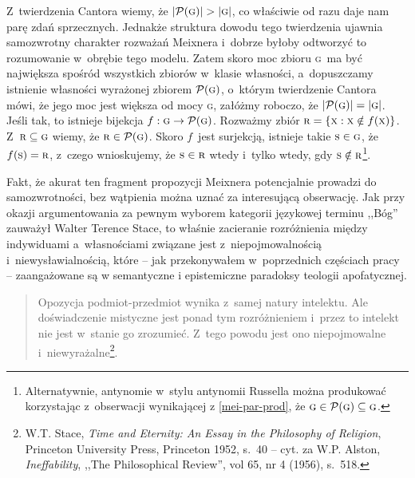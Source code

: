 Z~twierdzenia Cantora wiemy, że $\left|\mathcal{P}(\textsc{g})\right| > \left|\textsc{g}\right|$, co właściwie od razu daje nam parę zdań sprzecznych. Jednakże struktura dowodu tego twierdzenia ujawnia samozwrotny charakter rozważań Meixnera i~dobrze byłoby odtworzyć to rozumowanie w~obrębie tego modelu. Zatem skoro moc zbioru \textsc{g}~ma być największa spośród wszystkich zbiorów w~klasie własności, a~dopuszczamy istnienie własności wyrażonej zbiorem $\mathcal{P}(\textsc{g})$, o~którym twierdzenie Cantora mówi, że jego moc jest większa od mocy \textsc{g}, załóżmy roboczo, że $|\mathcal{P}(\textsc{g})| = |\textsc{g}|$. Jeśli tak, to istnieje bijekcja $f: \textsc{g} \to \mathcal{P}(\textsc{g})$. Rozważmy zbiór $\textsc{r} = \{\textsc{x}: \textsc{x} \notin f(\textsc{x})\}$. Z~$\textsc{r} \subseteq \textsc{g}$ wiemy, że $\textsc{r} \in \mathcal{P}(\textsc{g})$. Skoro $f$~jest surjekcją, istnieje takie $\textsc{s} \in \textsc{g}$, że $f(\textsc{s}) = \textsc{r}$, z~czego wnioskujemy, że $\textsc{s} \in \textsc{r}$ wtedy i~tylko wtedy, gdy $\textsc{s} \notin \textsc{r}$\footnote{Alternatywnie, antynomie w~stylu antynomii Russella można produkować korzystając z~obserwacji wynikającej z \eqref{mei-par-prod}, że $\textsc{g} \in \mathcal{P}(\textsc{g}) \subseteq \textsc{g}$.}.

Fakt, że akurat ten fragment propozycji Meixnera potencjalnie prowadzi do samozwrotności, bez wątpienia można uznać za interesującą obserwację. Jak przy okazji argumentowania za pewnym wyborem kategorii językowej terminu ,,Bóg'' zauważył Walter Terence Stace, to właśnie zacieranie rozróżnienia między indywiduami a~własnościami związane jest z~niepojmowalnością i~niewysławialnością, które -- jak przekonywałem w~poprzednich częściach pracy -- zaangażowane są w semantyczne i epistemiczne paradoksy teologii apofatycznej.

\begin{quote}
Opozycja podmiot-przedmiot wynika z~samej natury intelektu. Ale doświadczenie mistyczne jest ponad tym rozróżnieniem i~przez to intelekt nie jest w~stanie go zrozumieć. Z~tego powodu jest ono niepojmowalne i~niewyrażalne\footnote{W.T. Stace, \textit{Time and Eternity: An Essay in the Philosophy of Religion}, Princeton University Press, Princeton 1952, s.~40 -- cyt. za W.P. Alston, \textit{Ineffability}, ,,The Philosophical Review'', vol 65, nr 4 (1956), s.~518.}.
\end{quote}

